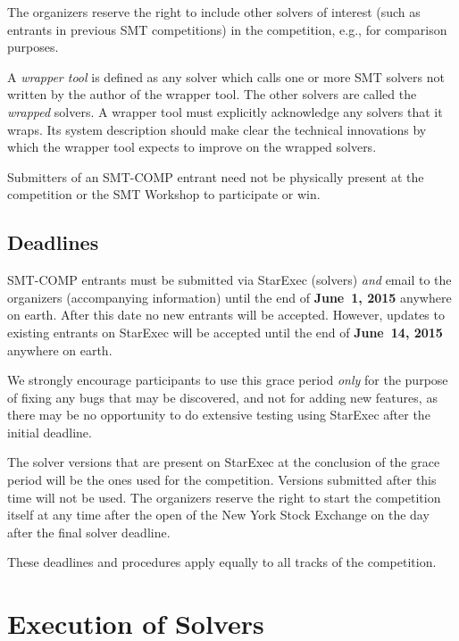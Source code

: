 \documentclass[12pt]{article}
\begin{document}
%
The organizers reserve the right to include other solvers of interest
(such as entrants in previous SMT competitions) in the competition,
e.g., for comparison purposes.

%
A \emph{wrapper tool} is defined as any solver which calls one or more
SMT solvers not written by the author of the wrapper tool.  The other
solvers are called the \emph{wrapped} solvers.  A wrapper tool must
explicitly acknowledge any solvers that it wraps.  Its system
description should make clear the technical innovations by which the
wrapper tool expects to improve on the wrapped solvers.

%
Submitters of an SMT-COMP entrant need not be physically present at
the competition or the SMT Workshop to participate or win.


\subsection*{Deadlines}

SMT-COMP entrants must be submitted via StarExec (solvers) \emph{and}
email to the organizers (accompanying information) until the end of
{\bf June~1, 2015} anywhere on earth.  After this date no new entrants
will be accepted.  However, updates to existing entrants on StarExec
will be accepted until the end of {\bf June~14, 2015} anywhere on
earth.

We strongly encourage participants to use this grace period
\emph{only} for the purpose of fixing any bugs that may be discovered,
and not for adding new features, as there may be no opportunity to do
extensive testing using StarExec after the initial deadline.

The solver versions that are present on StarExec at the conclusion of
the grace period will be the ones used for the competition.  Versions
submitted after this time will not be used.  The organizers reserve
the right to start the competition itself at any time after the open
of the New York Stock Exchange on the day after the final solver
deadline.

These deadlines and procedures apply equally to all tracks of the
competition.


\section{Execution of Solvers}
\end{document}
